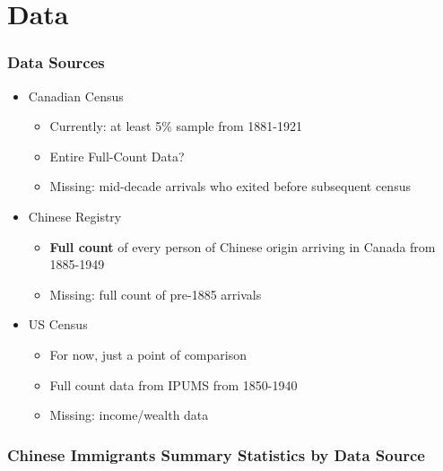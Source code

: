 \documentclass[pdf]{beamer}
\begin{document}
\section{Data}
\begin{frame}[label = datasources]
    \frametitle{Data Sources}
    \centering
    \begin{itemize}
        \item Canadian Census \hyperlink{cancensus}{}
        \begin{itemize}
            \item Currently: at least 5\% sample from 1881-1921
            \item Entire Full-Count Data? \hyperlink{censustweet}{}
            \item Missing: mid-decade arrivals who exited before subsequent census
        \end{itemize}
        \item Chinese Registry 
        \begin{itemize}
            \item \textbf{Full count} of every person of Chinese origin arriving in Canada from 1885-1949
            \item Missing: full count of pre-1885 arrivals
        \end{itemize}
        \item US Census 
        \begin{itemize}
            \item For now, just a point of comparison
            \item Full count data from IPUMS from 1850-1940
            \item Missing: income/wealth data
        \end{itemize}
    \end{itemize}
    
\end{frame}

\begin{frame}[label = summstats]
	\frametitle{Chinese Immigrants Summary Statistics by Data Source}        
    \centering 
	\begin{table}[H]
		\resizebox{\textwidth}{!}{
            
		}
	\end{table}  
    \hyperlink{summstatscensus}{}
\end{frame}
\end{document}
